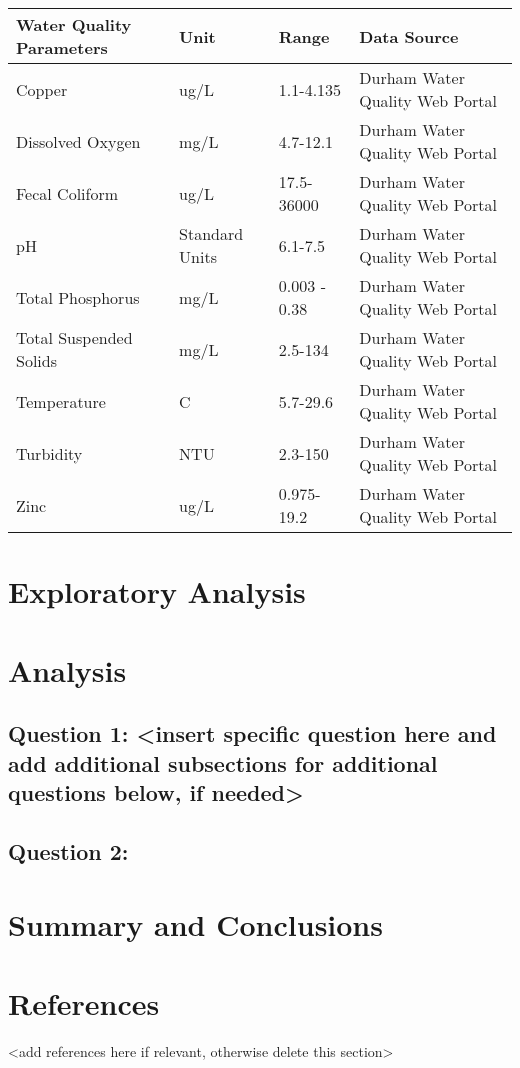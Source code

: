 \documentclass[
  12pt,
]{article}
\begin{document}
\begin{longtable}[]{@{}llll@{}}
\toprule
Water Quality Parameters & Unit & Range & Data Source\tabularnewline
\midrule
\endhead
Copper & ug/L & 1.1-4.135 & Durham Water Quality Web
Portal\tabularnewline
Dissolved Oxygen & mg/L & 4.7-12.1 & Durham Water Quality Web
Portal\tabularnewline
Fecal Coliform & ug/L & 17.5-36000 & Durham Water Quality Web
Portal\tabularnewline
pH & Standard Units & 6.1-7.5 & Durham Water Quality Web
Portal\tabularnewline
Total Phosphorus & mg/L & 0.003 - 0.38 & Durham Water Quality Web
Portal\tabularnewline
Total Suspended Solids & mg/L & 2.5-134 & Durham Water Quality Web
Portal\tabularnewline
Temperature & C & 5.7-29.6 & Durham Water Quality Web
Portal\tabularnewline
Turbidity & NTU & 2.3-150 & Durham Water Quality Web
Portal\tabularnewline
Zinc & ug/L & 0.975-19.2 & Durham Water Quality Web
Portal\tabularnewline
\bottomrule
\end{longtable}

\newpage

\hypertarget{exploratory-analysis}{%
\section{Exploratory Analysis}\label{exploratory-analysis}}

\newpage

\hypertarget{analysis}{%
\section{Analysis}\label{analysis}}

\hypertarget{question-1-insert-specific-question-here-and-add-additional-subsections-for-additional-questions-below-if-needed}{%
\subsection{Question 1: \textless insert specific question here and add
additional subsections for additional questions below, if
needed\textgreater{}}\label{question-1-insert-specific-question-here-and-add-additional-subsections-for-additional-questions-below-if-needed}}

\hypertarget{question-2}{%
\subsection{Question 2:}\label{question-2}}

\newpage

\hypertarget{summary-and-conclusions}{%
\section{Summary and Conclusions}\label{summary-and-conclusions}}

\newpage

\hypertarget{references}{%
\section{References}\label{references}}

\textless add references here if relevant, otherwise delete this
section\textgreater{}
\end{document}
